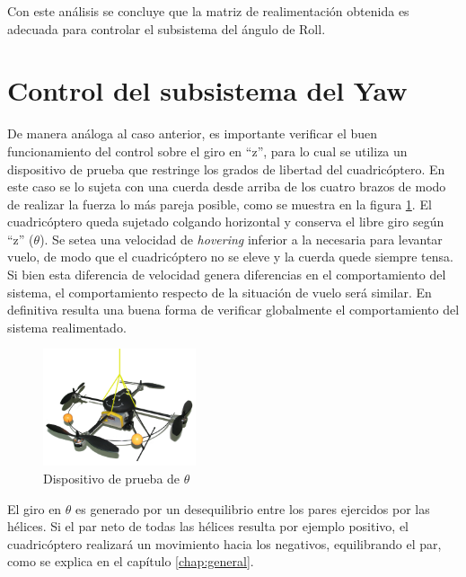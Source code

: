\documentclass[main]{subfiles}
\begin{document}
Con este an\'alisis se concluye que la matriz de realimentaci\'on obtenida es adecuada para controlar el subsistema del \'angulo de Roll.

\section{Control del subsistema del Yaw}

De manera an\'aloga al caso anterior, es importante verificar el buen funcionamiento del control sobre el giro en ``z'', para lo cual se utiliza un dispositivo de prueba que restringe los grados de libertad del cuadric\'optero. En este caso se lo sujeta con una cuerda desde arriba de los cuatro brazos de modo de realizar la fuerza lo m\'as pareja posible, como se muestra en la figura \ref{fig:thetadisp}. El cuadric\'optero queda sujetado colgando horizontal y conserva el libre giro seg\'un ``z'' ($\theta$).
Se setea una velocidad de \emph{hovering} inferior a la necesaria para levantar vuelo, de modo que el cuadric\'optero no se eleve y la cuerda quede siempre tensa. Si bien esta diferencia de velocidad genera diferencias en el comportamiento del sistema, el comportamiento respecto de la situaci\'on de vuelo ser\'a similar. En definitiva resulta una buena forma de verificar globalmente el comportamiento del sistema realimentado.\\

\begin{figure}
	\vspace{-20pt}
	\centering
	\includegraphics[width=0.4\textwidth]{./pics_test_control/dispositivo_theta.pdf}
	\caption{Dispositivo de prueba de $\theta$}
	\label{fig:thetadisp}
\end{figure}

El giro en $\theta$ es generado por un desequilibrio entre los pares ejercidos por las h\'elices. Si el par neto de todas las h\'elices resulta por ejemplo positivo, el cuadric\'optero realizar\'a un movimiento hacia los negativos, equilibrando el par, como se explica en el cap\'itulo \ref{chap:general}.\\
\end{document}
